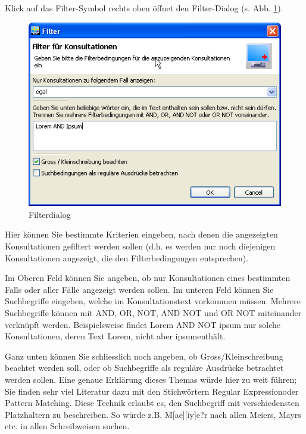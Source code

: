 Klick auf das Filter-Symbol rechts oben öffnet den Filter-Dialog (s. Abb. \ref{fig:konsfilter}).
\begin{figure}[htp]
\begin{center}
  \includegraphics{images/filterdialog}
  \caption{Filterdialog}
  \label{fig:konsfilter}
\end{center}
\end{figure}
 Hier können Sie bestimmte Kriterien eingeben, nach
denen die angezeigten Konsultationen gefiltert werden sollen (d.h. es werden nur
noch diejenigen Konsultationen angezeigt, die den Filterbedingungen
entsprechen).

Im Oberen Feld können Sie angeben, ob nur Konsultationen eines bestimmten Falls
oder aller Fälle angezeigt werden sollen. Im unteren Feld können Sie
Suchbegriffe eingeben, welche im Konsultationstext vorkommen müssen. Mehrere
Suchbegriffe können mit AND, OR, NOT, AND NOT und OR NOT miteinander verknüpft werden.
Beispielsweise findet \glqq Lorem AND NOT ipsum\grqq{} nur solche Konsultationen, deren
Text \glqq Lorem\grqq, nicht aber \glqq ipsum\grqq{}enthält.

Ganz unten können Sie schliesslich noch angeben, ob Gross/Kleinschreibung
beachtet werden soll, oder ob Suchbegriffe als reguläre Ausdrücke betrachtet
werden sollen. Eine genaue Erklärung dieses Themas würde hier zu weit führen;
Sie finden sehr viel Literatur dazu mit den Stichwörtern \glqq Regular
Expression\grqq{}oder \glqq Pattern Matching\grqq{}. Diese Technik erlaubt es,
den Suchbegriff mit verschiedensten Platzhaltern zu beschreiben. So würde z.B.
\glqq M[ae][iy]e?r\grqq{} nach allen Meiers, Mayrs etc. in allen Schreibweisen
suchen.


